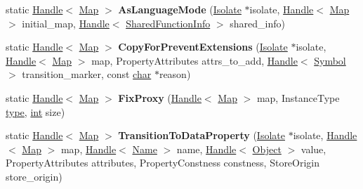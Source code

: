 \begin{DoxyCompactItemize}
\item 
\mbox{\label{classv8_1_1internal_1_1Map_a0f16fc348fe8bec58c59ae6bc670540a}} 
static \mbox{\hyperlink{classv8_1_1internal_1_1Handle}{Handle}}$<$ \mbox{\hyperlink{classv8_1_1internal_1_1Map}{Map}} $>$ {\bfseries As\+Language\+Mode} (\mbox{\hyperlink{classv8_1_1internal_1_1Isolate}{Isolate}} $\ast$isolate, \mbox{\hyperlink{classv8_1_1internal_1_1Handle}{Handle}}$<$ \mbox{\hyperlink{classv8_1_1internal_1_1Map}{Map}} $>$ initial\+\_\+map, \mbox{\hyperlink{classv8_1_1internal_1_1Handle}{Handle}}$<$ \mbox{\hyperlink{classv8_1_1internal_1_1SharedFunctionInfo}{Shared\+Function\+Info}} $>$ shared\+\_\+info)
\item 
\mbox{\label{classv8_1_1internal_1_1Map_a4884eb78e01afaa9c7b562509c8c127c}} 
static \mbox{\hyperlink{classv8_1_1internal_1_1Handle}{Handle}}$<$ \mbox{\hyperlink{classv8_1_1internal_1_1Map}{Map}} $>$ {\bfseries Copy\+For\+Prevent\+Extensions} (\mbox{\hyperlink{classv8_1_1internal_1_1Isolate}{Isolate}} $\ast$isolate, \mbox{\hyperlink{classv8_1_1internal_1_1Handle}{Handle}}$<$ \mbox{\hyperlink{classv8_1_1internal_1_1Map}{Map}} $>$ map, Property\+Attributes attrs\+\_\+to\+\_\+add, \mbox{\hyperlink{classv8_1_1internal_1_1Handle}{Handle}}$<$ \mbox{\hyperlink{classv8_1_1internal_1_1Symbol}{Symbol}} $>$ transition\+\_\+marker, const \mbox{\hyperlink{classchar}{char}} $\ast$reason)
\item 
\mbox{\label{classv8_1_1internal_1_1Map_aff1e9e4bf8854a3020fff7b2fbeb1d2c}} 
static \mbox{\hyperlink{classv8_1_1internal_1_1Handle}{Handle}}$<$ \mbox{\hyperlink{classv8_1_1internal_1_1Map}{Map}} $>$ {\bfseries Fix\+Proxy} (\mbox{\hyperlink{classv8_1_1internal_1_1Handle}{Handle}}$<$ \mbox{\hyperlink{classv8_1_1internal_1_1Map}{Map}} $>$ map, Instance\+Type \mbox{\hyperlink{classstd_1_1conditional_1_1type}{type}}, \mbox{\hyperlink{classint}{int}} size)
\item 
\mbox{\label{classv8_1_1internal_1_1Map_a2b8166d2ee28f66970c650e71cbe35a0}} 
static \mbox{\hyperlink{classv8_1_1internal_1_1Handle}{Handle}}$<$ \mbox{\hyperlink{classv8_1_1internal_1_1Map}{Map}} $>$ {\bfseries Transition\+To\+Data\+Property} (\mbox{\hyperlink{classv8_1_1internal_1_1Isolate}{Isolate}} $\ast$isolate, \mbox{\hyperlink{classv8_1_1internal_1_1Handle}{Handle}}$<$ \mbox{\hyperlink{classv8_1_1internal_1_1Map}{Map}} $>$ map, \mbox{\hyperlink{classv8_1_1internal_1_1Handle}{Handle}}$<$ \mbox{\hyperlink{classv8_1_1internal_1_1Name}{Name}} $>$ name, \mbox{\hyperlink{classv8_1_1internal_1_1Handle}{Handle}}$<$ \mbox{\hyperlink{classv8_1_1internal_1_1Object}{Object}} $>$ value, Property\+Attributes attributes, Property\+Constness constness, Store\+Origin store\+\_\+origin)

\end{DoxyCompactItemize}
